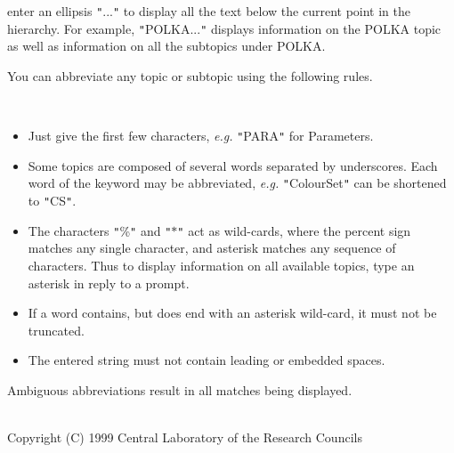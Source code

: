 \documentclass[twoside,11pt]{article}
\newcommand{\htmlref}[2]{#1}
\renewcommand{\_}{\texttt{\symbol{95}}}
\newcommand{\sstdiytopic}[2]{\item[{\hspace{-0.35em}#1\hspace{-0.35em}:}]
\mbox{} \\[1.3ex] #2}
\newcommand{\sstitemlist}[1]{
  \mbox{} \\
  \vspace{-3.5ex}
  \begin{itemize}
     #1
  \end{itemize}
}
\newcommand{\sstitem}{\item}
\newcommand{\sstdiytopic}[2]{\item[{#1}] #2 }
\newcommand{\sstitemlist}[1]{
      \begin{itemize}
         #1
      \end{itemize}
      \\
   }
\newcommand{\sstitem}{\item}
\begin{document}
{{{         \sstitem
            enter an ellipsis {\tt "}...{\tt "} to display all the text below the
               current point in the hierarchy.  For example, {\tt "}POLKA...{\tt "}
               displays information on the \htmlref{POLKA}{POLKA} topic as well as
               information on all the subtopics under POLKA.

      }
      You can abbreviate any topic or subtopic using the following
      rules.

      \sstitemlist{

         \sstitem
            Just give the first few characters, \emph{e.g.} {\tt "}PARA{\tt "} for
               Parameters.

         \sstitem
            Some topics are composed of several words separated by
               underscores.  Each word of the keyword may be abbreviated,
               \emph{e.g.} {\tt "}Colour\_Set{\tt "} can be shortened to {\tt "}C\_S{\tt "}.

         \sstitem
            The characters {\tt "}\%{\tt "} and {\tt "}$*${\tt "} act as wild-cards, where the
               percent sign matches any single character, and asterisk
               matches any sequence of characters.  Thus to display
               information on all available topics, type an asterisk in
               reply to a prompt.

         \sstitem
            If a word contains, but does end with an asterisk wild-card,
               it must not be truncated.

         \sstitem
            The entered string must not contain leading or embedded
               spaces.

      }
      Ambiguous abbreviations result in all matches being displayed.
   }
   \sstdiytopic{
      Copyright
   }{
      Copyright (C) 1999 Central Laboratory of the Research Councils
   }
}
\newpage
\end{document}
